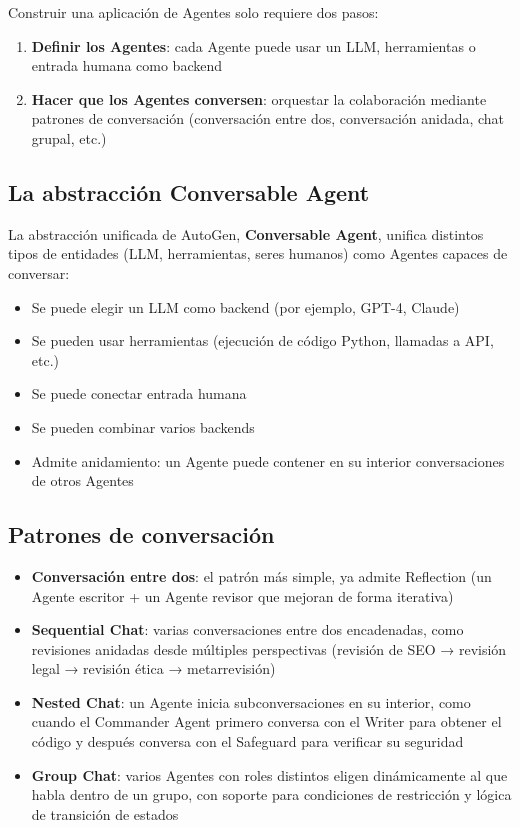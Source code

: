 \documentclass[a4paper]{article}
\begin{document}
Construir una aplicación de Agentes solo requiere dos pasos:
\begin{enumerate}
    \item \textbf{Definir los Agentes}: cada Agente puede usar un LLM, herramientas o entrada humana como backend
    \item \textbf{Hacer que los Agentes conversen}: orquestar la colaboración mediante patrones de conversación (conversación entre dos, conversación anidada, chat grupal, etc.)
\end{enumerate}

\subsection{La abstracción Conversable Agent}

La abstracción unificada de AutoGen, \textbf{Conversable Agent}, unifica distintos tipos de entidades (LLM, herramientas, seres humanos) como Agentes capaces de conversar:
\begin{itemize}
    \item Se puede elegir un LLM como backend (por ejemplo, GPT-4, Claude)
    \item Se pueden usar herramientas (ejecución de código Python, llamadas a API, etc.)
    \item Se puede conectar entrada humana
    \item Se pueden combinar varios backends
    \item Admite anidamiento: un Agente puede contener en su interior conversaciones de otros Agentes
\end{itemize}

\subsection{Patrones de conversación}

\begin{itemize}
    \item \textbf{Conversación entre dos}: el patrón más simple, ya admite Reflection (un Agente escritor + un Agente revisor que mejoran de forma iterativa)
    \item \textbf{Sequential Chat}: varias conversaciones entre dos encadenadas, como revisiones anidadas desde múltiples perspectivas (revisión de SEO → revisión legal → revisión ética → metarrevisión)
    \item \textbf{Nested Chat}: un Agente inicia subconversaciones en su interior, como cuando el Commander Agent primero conversa con el Writer para obtener el código y después conversa con el Safeguard para verificar su seguridad
    \item \textbf{Group Chat}: varios Agentes con roles distintos eligen dinámicamente al que habla dentro de un grupo, con soporte para condiciones de restricción y lógica de transición de estados
\end{itemize}
\end{document}
